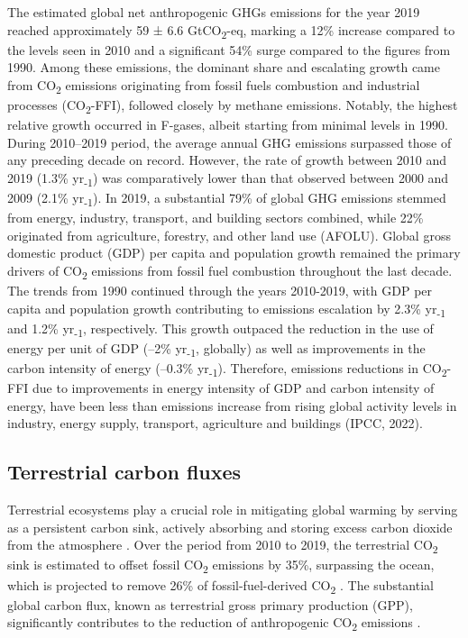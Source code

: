 The estimated global net anthropogenic GHGs emissions for the year 2019 reached approximately 59 ± 6.6 GtCO\textsubscript{2}-eq, marking a 12\% increase compared to the levels seen in 2010 and a significant 54\% surge compared to the figures from 1990. Among these emissions, the dominant share and escalating growth came from CO\textsubscript{2} emissions originating from fossil fuels combustion and industrial processes (CO\textsubscript{2}-FFI), followed closely by methane emissions. Notably, the highest relative growth occurred in F-gases, albeit starting from minimal levels in 1990. During 2010–2019 period, the average annual GHG emissions surpassed those of any preceding decade on record. However, the rate of growth between 2010 and 2019 (1.3\% yr\textsubscript{-1}) was comparatively lower than that observed between 2000 and 2009 (2.1\% yr\textsubscript{-1}). In 2019, a substantial 79\% of global GHG emissions stemmed from energy, industry, transport, and building sectors combined, while 22\% originated from agriculture, forestry, and other land use (AFOLU). Global gross domestic product (GDP) per capita and population growth remained the primary drivers of CO\textsubscript{2} emissions from fossil fuel combustion throughout the last decade. The trends from 1990 continued through the years 2010-2019, with GDP per capita and population growth contributing to emissions escalation by 2.3\% yr\textsubscript{-1} and 1.2\% yr\textsubscript{-1}, respectively. This growth outpaced the reduction in the use of energy per unit of GDP (–2\% yr\textsubscript{-1}, globally) as well as improvements in the carbon intensity of energy (–0.3\% yr\textsubscript{-1}). Therefore, emissions reductions in CO\textsubscript{2}-FFI due to improvements in energy intensity of GDP and carbon intensity of energy, have been less than emissions increase from rising global activity levels in industry, energy supply, transport, agriculture and buildings (IPCC, 2022). \par

\subsection{Terrestrial carbon fluxes}

Terrestrial ecosystems play a crucial role in mitigating global warming by serving as a persistent carbon sink, actively absorbing and storing excess carbon dioxide from the atmosphere \citep{pan2011large}. Over the period from 2010 to 2019, the terrestrial CO\textsubscript{2} sink is estimated to offset fossil CO\textsubscript{2} emissions by 35\%, surpassing the ocean, which is projected to remove 26\% of fossil-fuel-derived CO\textsubscript{2} \citep{friedlingstein2020global, wang2022disentangling}. The substantial global carbon flux, known as terrestrial gross primary production (GPP), significantly contributes to the reduction of anthropogenic CO\textsubscript{2} emissions \citep{beer2010terrestrial}. \par

